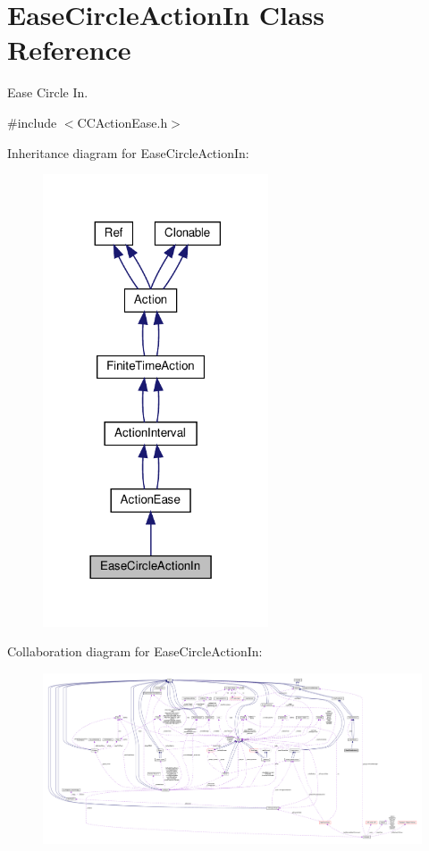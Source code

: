 \hypertarget{classEaseCircleActionIn}{}\section{Ease\+Circle\+Action\+In Class Reference}
\label{classEaseCircleActionIn}


Ease Circle In.  




{\ttfamily \#include $<$C\+C\+Action\+Ease.\+h$>$}



Inheritance diagram for Ease\+Circle\+Action\+In\+:
\nopagebreak
\begin{figure}[H]
\begin{center}
\leavevmode
\includegraphics[width=189pt]{classEaseCircleActionIn__inherit__graph}
\end{center}
\end{figure}


Collaboration diagram for Ease\+Circle\+Action\+In\+:
\nopagebreak
\begin{figure}[H]
\begin{center}
\leavevmode
\includegraphics[width=350pt]{classEaseCircleActionIn__coll__graph}
\end{center}
\end{figure}
